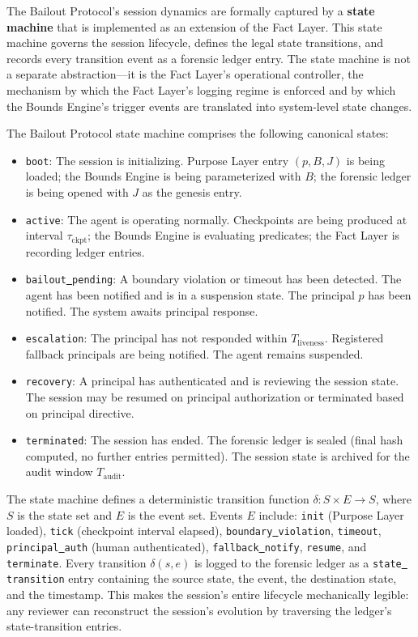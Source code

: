 The Bailout Protocol's session dynamics are formally captured by a \textbf{state machine} that is implemented as an extension of the Fact Layer. This state machine governs the session lifecycle, defines the legal state transitions, and records every transition event as a forensic ledger entry. The state machine is not a separate abstraction—it is the Fact Layer's operational controller, the mechanism by which the Fact Layer's logging regime is enforced and by which the Bounds Engine's trigger events are translated into system-level state changes.

The Bailout Protocol state machine comprises the following canonical states:

\begin{itemize}
    \item \texttt{boot}: The session is initializing. Purpose Layer entry $(p, B, J)$ is being loaded; the Bounds Engine is being parameterized with $B$; the forensic ledger is being opened with $J$ as the genesis entry.
    \item \texttt{active}: The agent is operating normally. Checkpoints are being produced at interval $\tau_{\text{ckpt}}$; the Bounds Engine is evaluating predicates; the Fact Layer is recording ledger entries.
    \item \texttt{bailout\underline{ }pending}: A boundary violation or timeout has been detected. The agent has been notified and is in a suspension state. The principal $p$ has been notified. The system awaits principal response.
    \item \texttt{escalation}: The principal has not responded within $T_{\text{liveness}}$. Registered fallback principals are being notified. The agent remains suspended.
    \item \texttt{recovery}: A principal has authenticated and is reviewing the session state. The session may be resumed on principal authorization or terminated based on principal directive.
    \item \texttt{terminated}: The session has ended. The forensic ledger is sealed (final hash computed, no further entries permitted). The session state is archived for the audit window $T_{\text{audit}}$.
\end{itemize}

The state machine defines a deterministic transition function $\delta: S \times E \rightarrow S$, where $S$ is the state set and $E$ is the event set. Events $E$ include: \texttt{init} (Purpose Layer loaded), \texttt{tick} (checkpoint interval elapsed), \texttt{boundary\underline{ }violation}, \texttt{timeout}, \texttt{principal\underline{ }auth} (human authenticated), \texttt{fallback\underline{ }notify}, \texttt{resume}, and \texttt{terminate}. Every transition $\delta(s, e)$ is logged to the forensic ledger as a \texttt{state\underline{ }transition} entry containing the source state, the event, the destination state, and the timestamp. This makes the session's entire lifecycle mechanically legible: any reviewer can reconstruct the session's evolution by traversing the ledger's state-transition entries.

